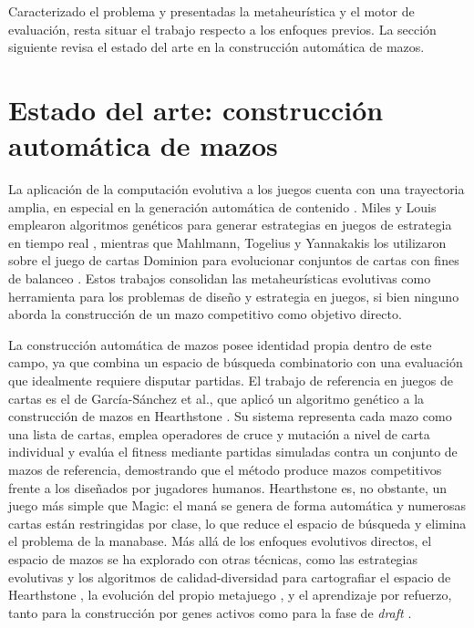 Caracterizado el problema y presentadas la metaheurística y el motor de evaluación, resta situar el trabajo respecto a los enfoques previos. La sección siguiente revisa el estado del arte en la construcción automática de mazos.

\section{Estado del arte: construcción automática de mazos}
\label{sec:estado-arte}

La aplicación de la computación evolutiva a los juegos cuenta con una trayectoria amplia, en especial en la generación automática de contenido \cite{togelius2011}. Miles y Louis emplearon algoritmos genéticos para generar estrategias en juegos de estrategia en tiempo real \cite{miles2006}, mientras que Mahlmann, Togelius y Yannakakis los utilizaron sobre el juego de cartas Dominion para evolucionar conjuntos de cartas con fines de balanceo \cite{mahlmann2012}. Estos trabajos consolidan las metaheurísticas evolutivas como herramienta para los problemas de diseño y estrategia en juegos, si bien ninguno aborda la construcción de un mazo competitivo como objetivo directo.

La construcción automática de mazos posee identidad propia dentro de este campo, ya que combina un espacio de búsqueda combinatorio con una evaluación que idealmente requiere disputar partidas. El trabajo de referencia en juegos de cartas es el de García-Sánchez et al., que aplicó un algoritmo genético a la construcción de mazos en Hearthstone \cite{garciasanchez2016}. Su sistema representa cada mazo como una lista de cartas, emplea operadores de cruce y mutación a nivel de carta individual y evalúa el fitness mediante partidas simuladas contra un conjunto de mazos de referencia, demostrando que el método produce mazos competitivos frente a los diseñados por jugadores humanos. Hearthstone es, no obstante, un juego más simple que Magic: el maná se genera de forma automática y numerosas cartas están restringidas por clase, lo que reduce el espacio de búsqueda y elimina el problema de la manabase. Más allá de los enfoques evolutivos directos, el espacio de mazos se ha explorado con otras técnicas, como las estrategias evolutivas y los algoritmos de calidad-diversidad para cartografiar el espacio de Hearthstone \cite{bhatt2018, fontaine2019, zhang2022}, la evolución del propio metajuego \cite{mesentier2019}, y el aprendizaje por refuerzo, tanto para la construcción por genes activos \cite{kowalski2020} como para la fase de \emph{draft} \cite{vieira2020}.

